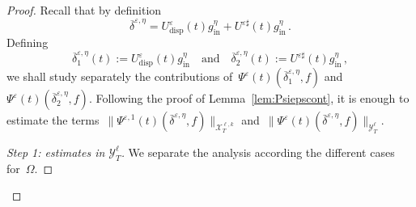 \documentclass[11pt]{article}
\theoremstyle{definition}
\numberwithin{equation}{section}
\numberwithin{figure}{section}
\numberwithin{table}{section}
\newenvironment{step}[1]{\begin{proof}[#1]}{\let\qed\relax\end{proof}}
\newcommand*\eps{{\varepsilon}}
\newcommand*\e{{\varepsilon}}
\DeclareMathOperator{\inn}{in}
\DeclareMathOperator{\disp}{disp}
\begin{document}
\begin{proof}
Recall that by definition
\[
\overline\delta^{\eps,\eta}= U^\e_{\disp}(t)g^{\eta}_{\inn} +U^{\e\sharp}(t) g^{\eta}_{\inn}\,.
\]
Defining
\begin{equation}\label{decompositiontildeg}
\overline \delta^{\eps,\eta}_1(t):=U^\e_{\disp}(t)g^{\eta}_{\inn} \quad \text{and} \quad \overline \delta^{\eps,\eta}_2(t):=U^{\e\sharp}(t) g^{\eta}_{\inn} \,,
\end{equation}
we shall study separately the contributions of~$\Psi^\eps(t)(\overline \delta^{\eps,\eta}_1,f)$ and $\Psi^\eps(t)(\overline \delta^{\eps,\eta}_2,f)$. Following the proof of Lemma~\ref{lem:Psiepscont}, it is enough to estimate the terms~$\|\Psi^{\eps,1}(t)(\bar\delta^{\eps,\eta},f) \|_{\mathcal{X}^{\ell,k}_T}$ and~$\|\Psi^{\eps}(t)(\bar\delta^{\eps,\eta},f) \|_{\mathcal{Y}^{\ell}_T}$.


\begin{step}{Step 1: estimates in $\mathcal{Y}^\ell_T$}
We separate the analysis according the different cases for~$\Omega$.


\end{step}
\end{proof}
\end{document}
